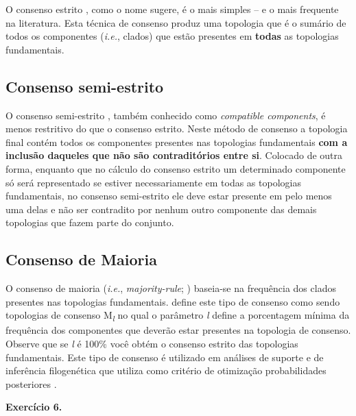 \begin{refsection}
O consenso estrito \parencite{Rohlf_1982}, como o nome sugere, é o mais simples -- e o mais frequente na literatura. Esta técnica de consenso produz uma topologia que é o sumário de todos os componentes (\textit{i.e.}, clados) que estão presentes em \textbf{todas} as topologias fundamentais.

\subsection{Consenso semi-estrito}\label{tut6:consenso:semi_strict}

O consenso semi-estrito \parencite{Bremer_1990}, também conhecido como \textit{compatible components}, é menos restritivo do que o consenso estrito. Neste método de consenso a topologia final contém todos os componentes presentes nas topologias fundamentais \textbf{com a inclusão daqueles que não são contraditórios entre si}. Colocado de outra forma, enquanto que no cálculo do consenso estrito um determinado componente só será representado se estiver necessariamente em todas as topologias fundamentais, no consenso semi-estrito ele deve estar presente em pelo menos uma delas e não ser contradito por nenhum outro componente das demais topologias que fazem parte do conjunto.

\subsection{Consenso de Maioria}\label{tut6:consenso:majority}

O consenso de maioria (\textit{i.e.}, \textit{majority-rule}; \textcite{Margush_and_McMorris_1981}) baseia-se na frequência dos clados presentes nas topologias fundamentais. \textcite{Margush_and_McMorris_1981} define este tipo de consenso como sendo topologias de consenso M\textsubscript{\textit{l}} no qual o parâmetro \textit{l} define a porcentagem mínima da frequência dos componentes que deverão estar presentes na topologia de consenso. Observe que se \textit{l} é 100\% você obtém o consenso estrito das topologias fundamentais. Este tipo de consenso é utilizado em análises de suporte e de inferência filogenética que utiliza como critério de otimização probabilidades posteriores \parencite[\textit{i.e.}, análises bayesianas; veja][]{Holder_et_al_2008}.\\


\begin{blackBlock}{\textbf{Exercício 6.}}\label{tut6:ex:6.4}


\end{blackBlock}
\end{refsection}
